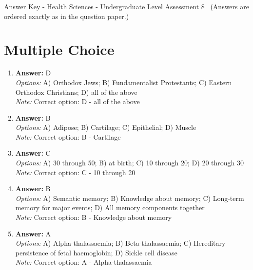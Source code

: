 \documentclass[12pt]{article}
\begin{document}
\begin{center}
Answer Key - Health Sciences - Undergraduate Level Assessment 8 \
\small (Answers are ordered exactly as in the question paper.)
\end{center}

\section*{Multiple Choice}
\begin{enumerate}[label=\arabic*.]
\item \textbf{Answer:} D
\\ \textit{Options:} A) Orthodox Jews; B) Fundamentalist Protestants; C) Eastern Orthodox Christians; D) all of the above
\\ \textit{Note:} Correct option: D - all of the above
\item \textbf{Answer:} B
\\ \textit{Options:} A) Adipose; B) Cartilage; C) Epithelial; D) Muscle
\\ \textit{Note:} Correct option: B - Cartilage
\item \textbf{Answer:} C
\\ \textit{Options:} A) 30 through 50; B) at birth; C) 10 through 20; D) 20 through 30
\\ \textit{Note:} Correct option: C - 10 through 20
\item \textbf{Answer:} B
\\ \textit{Options:} A) Semantic memory; B) Knowledge about memory; C) Long-term memory for major events; D) All memory components together
\\ \textit{Note:} Correct option: B - Knowledge about memory
\item \textbf{Answer:} A
\\ \textit{Options:} A) Alpha-thalassaemia; B) Beta-thalassaemia; C) Hereditary persistence of fetal haemoglobin; D) Sickle cell disease
\\ \textit{Note:} Correct option: A - Alpha-thalassaemia
\end{enumerate}
\end{document}
